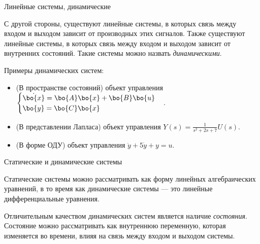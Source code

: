 \documentclass{beamer}
\begin{document}
\begin{frame}{Линейные системы, динамические}
	\begin{flushleft}
		
		С другой стороны, существуют линейные системы, в которых связь между входом и выходом зависит от производных этих сигналов. Также существуют линейные системы, в которых связь между входом и выходом зависит от внутренних состояний. Такие системы можно назвать \emph{динамическими}.
		
		\bigskip
		
		Примеры динамических систем:
		
		\begin{itemize}
			\item (В пространстве состояний) объект управления $\begin{cases}
				\dot {\bo{x}} = \bo{A} \bo{x} + \bo{B} \bo{u} \\
				\bo{y} = \bo{C} \bo{x}
			\end{cases}$.
			
			\item (В представлении Лапласа) объект управления $Y(s) = \frac{1}{s^2 + 2s + 7} U(s)$.
			
			\item (В форме ОДУ) объект управления $\ddot y + 5 \dot y + y = u$.
		\end{itemize}
		
	\end{flushleft}
\end{frame}

\begin{frame}{Статические и динамические системы}
	\begin{flushleft}
		
		Статические системы можно рассматривать как форму линейных алгебраических уравнений, в то время как динамические системы — это линейные дифференциальные уравнения.
		
		\bigskip
		
		Отличительным качеством динамических систем является наличие \emph{состояния}. Состояние можно рассматривать как внутреннюю переменную, которая изменяется во времени, влияя на связь между входом и выходом системы.
		
	\end{flushleft}
\end{frame}
\end{document}
